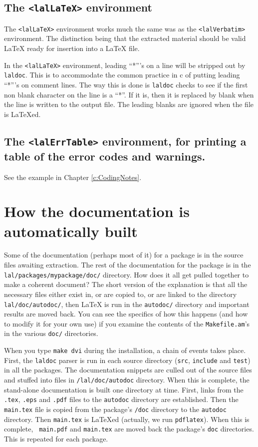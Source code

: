 \documentclass[oneside]{book}
\begin{document}
\subsection{The {\texttt {<lalLaTeX>} } environment }

The {\texttt {<lalLaTeX>} } environment works much the same
was as the {\texttt {<lalVerbatim>} } environment. The distinction
being that the extracted material should be valid {\LaTeX} ready
for insertion into a {\LaTeX} file. 

In the {\texttt {<lalLaTeX>}} environment, leading ``*'''s on a line 
will be stripped out by {\tt laldoc}. This is to accommodate the common
practice in c of putting leading ``*'''s on comment lines.  The way
this is done is {\tt laldoc} checks to see if the first non blank
character on the line is a ``*''. If it is, then it is replaced by
blank when the line is written to the output file. The leading
blanks are ignored when the file is {\LaTeX}ed.


\subsection{The {\texttt {<lalErrTable>} } environment, for printing
a table of the error codes and warnings.}

See the example in Chapter \ref{c:CodingNotes}.


\section{How the documentation is automatically built}

Some of the documentation (perhaps most of it)  for a package is in
the source files awaiting extraction.  The rest of the documentation
for the package is in the {\tt lal/packages/mypackage/doc/} directory.
How does it all get pulled together to make a coherent document?  The
short version of the explanation is that all the necessary files
either exist in, or are copied to, or are linked to the directory {\tt
lal/doc/autodoc/}, then {\LaTeX} is run in the {\tt autodoc/} directory
and important results are moved back.  You can see the specifics of
how this happens (and how to modify it for your own use) if you examine
the contents of the {\tt Makefile.am}'s in the various {\tt doc/}
directories.

When  you type {\tt make dvi} during the installation, a chain of
events takes place. First, the {\tt laldoc} parser is run in each
source directory ({\tt src}, {\tt include} and {\tt test}) in all the
packages.  The documentation snippets are culled out of the source
files and stuffed into files in {\tt /lal/doc/autodoc} directory. When
this is complete, the stand-alone documentation is built one directory
at time.  First, links from the {\tt .tex}, {\tt .eps} and {\tt .pdf}
files to the {\tt autodoc} directory are established.  Then the {\tt
main.tex} file is copied from the package's  {\tt /doc} directory to
the {\tt autodoc} directory. Then {\tt main.tex} is {\LaTeX}ed
(actually, we run {\tt pdflatex}). When this is complete, {\tt
main.pdf}  and {\tt main.tex} are moved back the package's {\tt doc}
directories.  This is repeated for each package.
\end{document}
